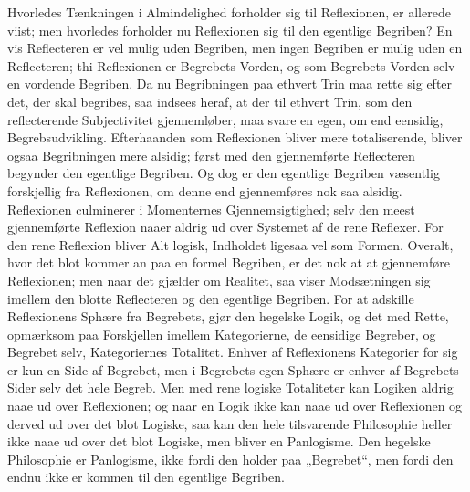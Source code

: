 \documentclass[11pt]{book}
\newcommand{\opage}[1]{\marginnote{\footnotesize\textit{[#1]}}}
\begin{document}
Hvorledes Tænkningen i Almindelighed forholder sig til Reflexionen, er
allerede viist; men hvorledes forholder nu Reflexionen sig til den
egentlige Begriben? En vis Reflecteren er vel mulig uden Begriben, men
ingen Begriben er mulig
\opage{144} \setcounter{footnote}{0}%
uden en Reflecteren; thi Reflexionen er Begrebets Vorden, og som Begrebets
Vorden selv en vordende Begriben. Da nu Begribningen paa ethvert Trin maa
rette sig efter det, der skal begribes, saa indsees heraf, at der til
ethvert Trin, som den reflecterende Subjectivitet gjennemløber, maa svare
en egen, om end eensidig, Begrebsudvikling. Efterhaanden som Reflexionen
bliver mere totaliserende, bliver ogsaa Begribningen mere alsidig; først
med den gjennemførte Reflecteren begynder den egentlige Begriben. Og dog
er den egentlige Begriben væsentlig forskjellig fra Reflexionen, om denne
end gjennemføres nok saa alsidig. Reflexionen culminerer i Momenternes
Gjennemsigtighed; selv den meest gjennemførte Reflexion naaer aldrig ud
over Systemet af de rene Reflexer. For den rene Reflexion bliver Alt
logisk, Indholdet ligesaa vel som Formen. Overalt, hvor det blot kommer an
paa en formel Begriben, er det nok at at gjennemføre Reflexionen;
men naar det gjælder om Realitet, saa viser Modsætningen sig imellem den
blotte Reflecteren og den egentlige Begriben. For at adskille Reflexionens
Sphære fra Begrebets, gjør den hegelske Logik, og det med Rette,
opmærksom paa Forskjellen imellem Kategorierne, de eensidige Begreber, og
Begrebet selv, Kategoriernes Totalitet. Enhver af Reflexionens Kategorier
for sig er kun en Side af Begrebet, men i Begrebets egen Sphære er enhver
af Begrebets Sider selv det hele Begreb. Men med rene logiske Totaliteter
kan Logiken aldrig naae ud over Reflexionen; og naar en Logik ikke kan
naae ud over Reflexionen og derved ud over det blot Logiske, saa kan den
hele tilsvarende Philosophie heller ikke naae ud over det blot Logiske,
men bliver en Panlogisme. Den hegelske Philosophie er Panlogisme, ikke
fordi den holder paa „Begrebet“, men fordi den endnu ikke er kommen til
den egentlige Begriben.
\end{document}
